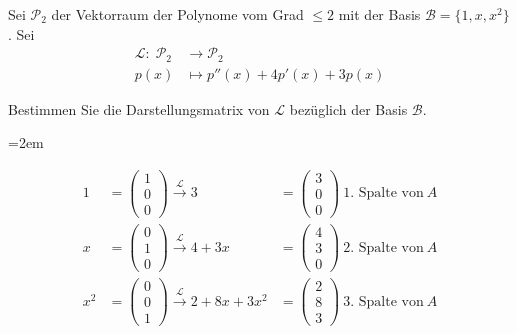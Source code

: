 \subsubsection{} %

Sei \( \mathcal{P}_2 \) der Vektorraum der Polynome vom Grad \( \leq 2 \) mit der Basis \( \mathcal{B} = \{1,x,x^2\} \). Sei
\begin{equation*}
    \begin{aligned}
        \mathcal{L}: \; \mathcal{P}_2 &\rightarrow \mathcal{P}_2 \\
        p(x) &\mapsto p''(x)+4p'(x)+3p(x)
    \end{aligned}
\end{equation*}

Bestimmen Sie die Darstellungsmatrix von \( \mathcal{L} \) bezüglich der Basis \( \mathcal{B} \).

\vspace{1\baselineskip}

\begin{solution}    

    \vspace{1\baselineskip}

    \leftskip=2em

    \begin{equation*}
        \begin{aligned}
            1 &= \begin{pmatrix} 1 \\ 0 \\ 0\end{pmatrix} \xrightarrow{\mathcal{L}} 3 &= \begin{pmatrix}3 \\ 0 \\ 0 \end{pmatrix} \ \text{1. Spalte von} \ A \\
            x &= \begin{pmatrix} 0 \\ 1 \\ 0\end{pmatrix} \xrightarrow{\mathcal{L}} 4+3x &= \begin{pmatrix} 4 \\ 3 \\ 0 \end{pmatrix} \ \text{2. Spalte von} \ A \\
            x^2 &= \begin{pmatrix} 0 \\ 0 \\ 1\end{pmatrix} \xrightarrow{\mathcal{L}} 2+8x+3x^2 &= \begin{pmatrix} 2 \\ 8 \\ 3 \end{pmatrix} \ \text{3. Spalte von} \ A
        \end{aligned}
    \end{equation*}

\end{solution}

